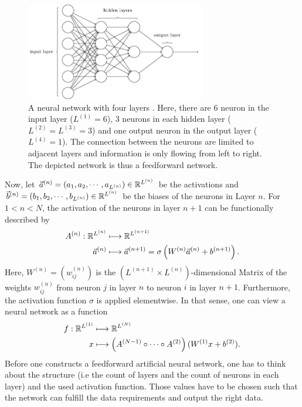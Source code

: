 \begin{figure}[H]
  \centering
  \includegraphics[width=0.7\textwidth]{media/network.png}
  \caption{A neural network with four layers \cite{nielsen}. Here, there are 6 neuron in the input layer ($L^{(1)} = 6$), 3 neurons in each hidden layer ($L^{(2)} = L^{(3)} = 3$) and one output neuron in the output layer ($L^{(4)}=1$). The connection between the neurons are limited to adjacent layers and information is only flowing from left to right. The depicted network is thus a feedforward network.}
  \label{fig:nn}
\end{figure}

Now, let $\vec{a}^{(n)} = (a_1, a_2, \dotsb, a_{L^{(n)}}) \in \mathbb{R}^{L^{(n)}}$ be the activations and $\vec{b}^{(n)} = (b_1, b_2, \dotsb, b_{L^{(n)}}) \in \mathbb{R}^{L^{(n)}}$ be the biases of the neurons in Layer $n$. For $1< n < N$, the activation of the neurons in layer $n+1$ can be functionally described by
\begin{align}
  A^{(n)}: \mathbb{R}^{L^{(n)}} & \longmapsto \mathbb{R}^{L^{(n+1)}}                                                        \\
  \vec{a}^{(n)}         & \longmapsto \vec{a}^{(n+1)} = \sigma\left(W^{(n)}\vec{a}^{(n)} +b^{(n+1)}\right).
\end{align}
Here, $W^{(n)} = (w^{(n)}_{ij})$ is the $(L^{(n+1)} \times L^{(n)})$-dimensional Matrix of the weights $w^{(n)}_{ij}$ from neuron $j$ in layer $n$ to neuron $i$ in layer $n+1$. Furthermore, the activation function $\sigma$ is applied elementwise. In that sense, one can view a neural network as a function
\begin{align}
  \label{eqn:ann_function}
  f: \mathbb{R}^{L^{(1)}} & \longmapsto \mathbb{R}^{L^{(N)}}                                                           \\
  x               & \longmapsto \left(A^{(N-1)} \circ \dotsb \circ A^{(2)}\right)(W^{(1)}x + b^{(2)}).
\end{align}
Before one constructs a feedforward artificial neural network, one has to think about the structure (i.e the count of layers and the count of neurons in each layer) and the used activation function. Those values have to be chosen such that the network can fulfill the data requirements and output the right data.


